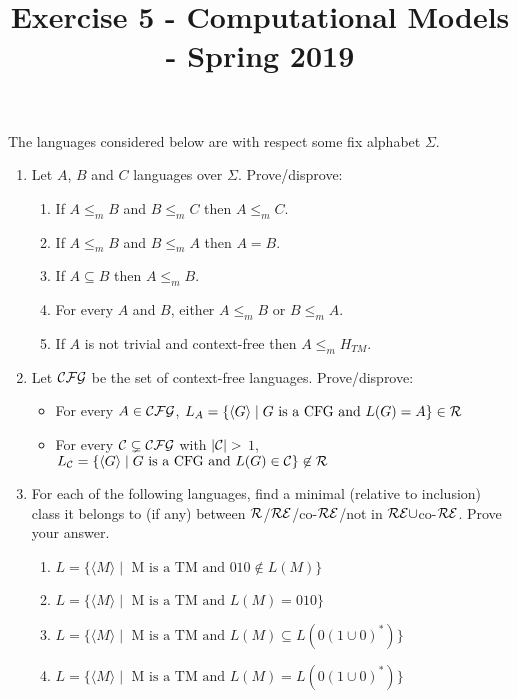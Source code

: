 \documentclass[12pt]{article}
\title{Exercise 5 - Computational Models - Spring 2019}
\date{}
\begin{document}
\maketitle

The languages considered  below are with respect some fix alphabet $\Sigma$.

\begin{enumerate}

\item Let $A$, $B$ and $C$ languages over $\Sigma$. Prove/disprove:
\begin{enumerate}
    \item If $A \leq_m B$ and $B \leq_m C$ then $A \leq_m C$.
    \item If $A \leq_m B$ and $B \leq_m A$ then $A = B$.
    \item If $A \subseteq B$ then $A \leq_m B$.
    \item For every $A$ and $B$, either $A \leq_m B$ or $B \leq_m A$.
    \item If $A$ is not trivial and context-free then $A \leq_m H_{TM}$.
\end{enumerate}

\item Let $\cal{CFG}$ be the set of context-free languages. Prove/disprove:
\begin{itemize}
    \item For every $A \in \cal{CFG}$, $L_A = \{\langle G \rangle \mid G \text{ is a CFG and } L(G) = A\} \in
    \cal{R}$
    \item For every $\cal{C} \subsetneq \cal{CFG}$ with $|\cal{C}| >$ $1$,  \\$L_{\cal{C}} = \{\langle G\rangle \mid G\text{ is a CFG and }L(G) \in \cal{C}\} \not\in
    \cal{R}$
\end{itemize}

\item
For each of the following languages, find a minimal (relative to
inclusion) class it belongs to (if any) between
$\cal{R}$/$\cal{RE}$/co-$\cal{RE}$/not in
$\cal{RE}\cup$co-$\cal{RE}$. Prove your answer.
\begin{enumerate}
    \item $L = \{\langle M \rangle \mid \mbox{ M is a TM and } 010 \notin L(M) \}$
    \item $L = \{\langle M \rangle \mid \mbox{ M is a TM and }  L(M) = 010 \}$
    \item $L = \{\langle M \rangle \mid \mbox{ M is a TM and }  L(M) \subseteq L(0(1\cup0)^*)\}$
    \item $L = \{\langle M \rangle \mid   \mbox{ M is a TM and }L(M) = L(0(1\cup0)^*)\}$


\end{enumerate}
\end{enumerate}
\end{document}
